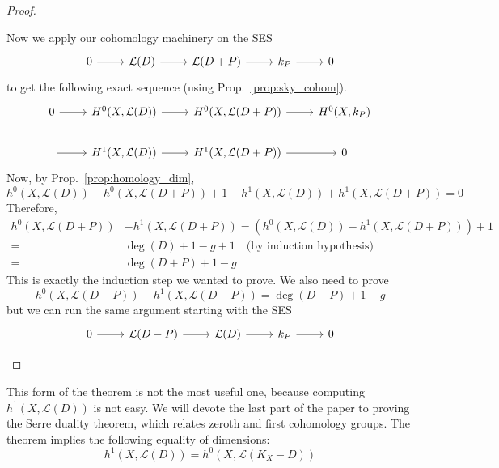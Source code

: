 \documentclass[12pt]{article}
\begin{document}
\begin{proof}
\begin{description}[style=nextline]
          Now we apply our cohomology machinery on the SES
          \[
          \begin{tikzcd}
            0\arrow{r} & \mathcal{L}(D)\arrow{r} & \mathcal{L}(D+P)\arrow{r}
            & k_{P}\arrow{r} & 0
          \end{tikzcd}
          \]
          to get the following exact sequence (using
          Prop.~\ref{prop:sky_cohom}).
          \[
          \begin{tikzcd}
            0\arrow{r} & H^{0}(X, \mathcal{L}(D))\arrow{r}
            & H^{0}(X, \mathcal{L}(D+P))\arrow{r}
            & H^{0}(X, k_{P}) \\
            \arrow{r} & H^{1}(X, \mathcal{L}(D))\arrow{r}
            & H^{1}(X, \mathcal{L}(D+P))\arrow{r} & 0
          \end{tikzcd}
          \]
          Now, by Prop.~\ref{prop:homology_dim},
          \[
          h^{0}(X,\mathcal{L}(D))-h^{0}(X, \mathcal{L}(D+P))
          +1-h^{1}(X,\mathcal{L}(D))+h^{1}(X,\mathcal{L}(D+P)) = 0
          \]
          Therefore,
          \begin{align*}
            h^{0}(X,\mathcal{L}(D+P))&-h^{1}(X,\mathcal{L}(D+P))
            =\left(h^{0}(X,\mathcal{L}(D))-h^{1}(X,\mathcal{L}(D+P))\right)
              +1 \\
            =&\deg(D)+1-g+1\quad\text{(by induction hypothesis)} \\
            =&\deg(D+P)+1-g
          \end{align*}
          This is exactly the induction step we wanted to prove.
          We also need to prove
          \[
            h^{0}(X,\mathcal{L}(D-P))-h^{1}(X,\mathcal{L}(D-P))
            =\deg(D-P)+1-g
          \]
          but we can run the same argument starting with the SES
          \[
          \begin{tikzcd}
            0\arrow{r} & \mathcal{L}(D-P)\arrow{r} & \mathcal{L}(D)\arrow{r}
            & k_{P}\arrow{r} & 0
          \end{tikzcd}
          \]
  \end{description}
\end{proof}

This form of the theorem is not the most useful one, because computing
$h^{1}(X,\mathcal{L}(D))$ is not easy. We will devote the last part
of the paper to proving the Serre duality theorem, which relates
zeroth and first cohomology groups. The theorem implies the
following equality of dimensions:
\[h^{1}(X,\mathcal{L}(D))=h^{0}(X,\mathcal{L}(K_{X}-D))\]
\end{document}
